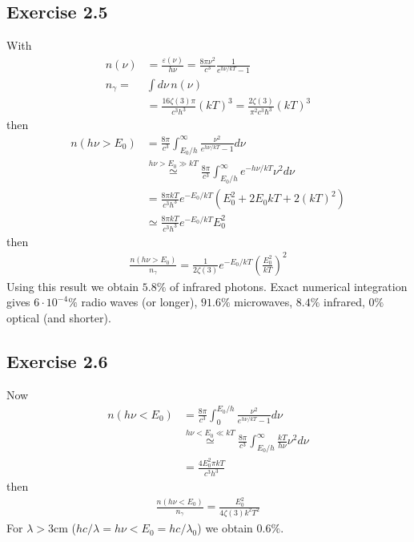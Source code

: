 \documentclass[10pt,a4paper]{book}
\theoremstyle{definition}
\begin{document}
\subsection{Exercise 2.5}
With
\begin{align}
n(\nu)&=\frac{\varepsilon(\nu)}{h\nu}=\frac{8\pi\nu^2}{c^3}\frac{1}{e^{h\nu/kT}-1}\\
n_\gamma=&\int d\nu\,n(\nu)\\
&=\frac{16\zeta(3)\pi}{c^3h^3}(kT)^3
=\frac{2\zeta(3)}{\pi^2c^3\hbar^3}(kT)^3
\end{align}
then
\begin{align}
n(h\nu>E_0)&=\frac{8\pi}{c^3}\int_{E_0/h}^\infty\frac{\nu^2}{e^{h\nu/kT}-1}d\nu\\
&\overset{h\nu>E_0\gg kT}{\simeq}\frac{8\pi}{c^3}\int_{E_0/h}^\infty e^{-h\nu/kT}\nu^2 d\nu\\
&=\frac{8\pi kT}{c^3h^3}e^{-E_0/kT}(E_0^2+2E_0kT+2(kT)^2)\\
&\simeq\frac{8\pi kT}{c^3h^3}e^{-E_0/kT}E_0^2
\end{align}
then
\begin{align}
\frac{n(h\nu>E_0)}{n_\gamma}=\frac{1}{2\zeta(3)}e^{-E_0/kT}\left(\frac{E_0^2}{kT}\right)^2
\end{align}
Using this result we obtain $5.8\%$ of infrared photons. Exact numerical integration gives $6\cdot10^{-4}\%$ radio waves (or longer), $91.6\%$ microwaves, $8.4\%$ infrared, $0\%$ optical (and shorter).

\subsection{Exercise 2.6}
Now
\begin{align}
n(h\nu<E_0)&=\frac{8\pi}{c^3}\int_0^{E_0/h}\frac{\nu^2}{e^{h\nu/kT}-1}d\nu\\
&\overset{h\nu<E_0\ll kT}{\simeq}\frac{8\pi}{c^3}\int_{E_0/h}^\infty \frac{kT}{h\nu}\nu^2d\nu\\
&=\frac{4E_0^2 \pi kT}{c^3h^3}
\end{align}
then
\begin{align}
\frac{n(h\nu<E_0)}{n_\gamma}=\frac{E_0^2}{4\zeta(3)k^2T^2}
\end{align}
For $\lambda>3$cm ($hc/\lambda=h\nu<E_0=hc/\lambda_0$) we obtain $0.6\%$.
\end{document}
